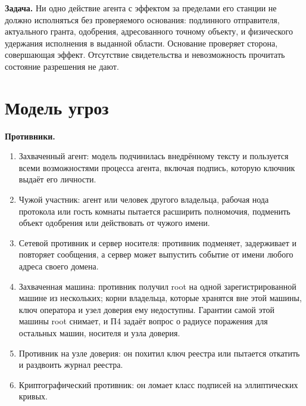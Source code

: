 \documentclass[10pt,a4paper]{article}
\begin{document}
\textbf{Задача.} Ни одно действие агента с эффектом за пределами его станции не должно исполняться без проверяемого основания: подлинного отправителя, актуального гранта, одобрения, адресованного точному объекту, и физического удержания исполнения в выданной области. Основание проверяет сторона, совершающая эффект. Отсутствие свидетельства и невозможность прочитать состояние разрешения не дают.

\section{Модель угроз}
\label{sec:threats}

\textbf{Противники.}
\begin{enumerate}[label=П\arabic*.]
\item Захваченный агент: модель подчинилась внедрённому тексту и пользуется всеми возможностями процесса агента, включая подпись, которую ключник выдаёт его личности.
\item Чужой участник: агент или человек другого владельца, рабочая нода протокола или гость комнаты пытается расширить полномочия, подменить объект одобрения или действовать от чужого имени.
\item Сетевой противник и сервер носителя: противник подменяет, задерживает и повторяет сообщения, а сервер может выпустить событие от имени любого адреса своего домена.
\item Захваченная машина: противник получил root на одной зарегистрированной машине из нескольких; корни владельца, которые хранятся вне этой машины, ключ оператора и узел доверия ему недоступны. Гарантии самой этой машины root снимает, и П4 задаёт вопрос о радиусе поражения для остальных машин, носителя и узла доверия.
\item Противник на узле доверия: он похитил ключ реестра или пытается откатить и раздвоить журнал реестра.
\item Криптографический противник: он ломает класс подписей на эллиптических кривых.
\end{enumerate}
\end{document}
